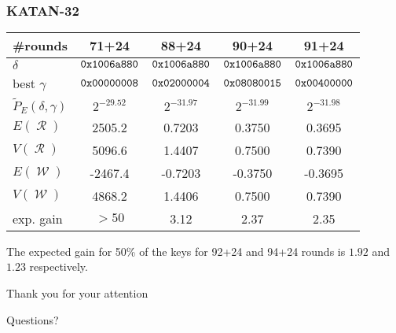 \documentclass[11pt]{beamer}
\DeclareMathOperator{\R}{\mathcal{R}}
\DeclareMathOperator{\W}{\mathcal{W}}
\begin{document}
\begin{frame}
\frametitle{KATAN-32} 

\begin{small}
\begin{center}
\begin{tabular}{|l|c|c|c|c|}
\hline
\#rounds                    & 71+24 & 88+24 & 90+24 & 91+24\\
\hline
$\delta$                    & ${\tt 0x1006a880}$ & ${\tt 0x1006a880}$ & ${\tt 0x1006a880}$ & ${\tt 0x1006a880}$\\
best $\gamma$               & ${\tt 0x00000008}$ & ${\tt 0x02000004}$ & ${\tt 0x08080015}$ & ${\tt 0x00400000}$\\
$\tilde P_E(\delta,\gamma)$ & $2^{-29.52}$       & $2^{-31.97}$       & $2^{-31.99}$       & $2^{-31.98}$\\
\hline
$E(\R)$                     &  2505.2 &  0.7203 &  0.3750 &  0.3695\\ 
$V(\R)$                     &  5096.6 &  1.4407 &  0.7500 &  0.7390\\ 
$E(\W)$                     & -2467.4 & -0.7203 & -0.3750 & -0.3695\\ 
$V(\W)$                     &  4868.2 &  1.4406 &  0.7500 &  0.7390\\
\hline
exp. gain                   & $>50$ & 3.12 & 2.37 & 2.35\\
\hline
\end{tabular}
\end{center}
\end{small}

\vspace{0.5em}

The expected gain for 50\% of the keys for 92+24 and 94+24 rounds is $1.92$ and $1.23$ respectively.

\end{frame}

\begin{frame}{Thank you for your attention}
\begin{center}
\begin{Huge}

\begin{center}
Questions?
\end{center}
\end{Huge}
\end{center}
\end{frame}
\end{document}
